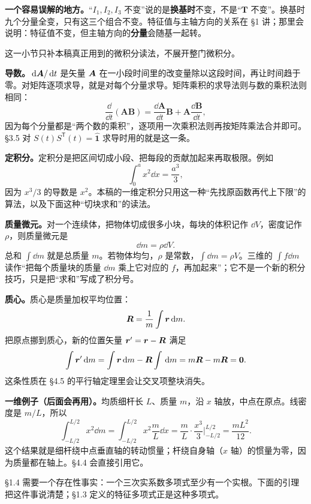 \documentclass[11pt]{ctexart}
\newcommand{\ten}[1]{\mathbf{#1}}
\newcommand{\unitd}{\hat{\ten{1}}}
\let\origsubhdr\subhdr
\renewcommand{\subhdr}[1]{\par\needspace{3\baselineskip}\origsubhdr{#1}}
\begin{document}
\textbf{一个容易误解的地方。}“$I_1,I_2,I_3$ 不变”说的是\textbf{换基时}不变，不是“$\ten T$ 不变”。换基时九个分量全变，只有这三个组合不变。特征值与主轴方向的关系在 \S1 讲；那里会说明：特征值不变，但主轴方向的\textbf{分量}会随基一起转。

\label{subsec:calculus}

这一小节只补本稿真正用到的微积分读法，不展开整门微积分。

\textbf{导数。}$\,\mathrm{d}\boldsymbol{A}/\,\mathrm{d} t$ 是矢量 $\boldsymbol{A}$ 在一小段时间里的改变量除以这段时间，再让时间趋于零。对矩阵逐项求导，就是对每个分量求导。矩阵乘积的求导法则与数的乘积法则相同：
\[
\frac{\dd}{\dd t}(\ten A\ten B)=\frac{\dd\ten A}{\dd t}\ten B+\ten A\frac{\dd\ten B}{\dd t},
\]
因为每个分量都是“两个数的乘积”，逐项用一次乘积法则再按矩阵乘法合并即可。\S3.5 对 $S(t)S^{\mathsf T}(t)=\unitd$ 求导时用的就是这一条。

\textbf{定积分。}定积分是把区间切成小段、把每段的贡献加起来再取极限。例如
\[
\int_0^a x^2\dd x=\frac{a^3}{3},
\]
因为 $x^3/3$ 的导数是 $x^2$。本稿的一维定积分只用这一种“先找原函数再代上下限”的算法，以及下面这种“切块求和”的读法。

\textbf{质量微元。}对一个连续体，把物体切成很多小块，每块的体积记作 $\dd V$，密度记作 $\rho$，则质量微元是
\[
\dd m=\rho\dd V .
\]
总和 $\int\dd m$ 就是总质量 $m$。若物体均匀，$\rho$ 是常数，$\int\dd m=\rho V$。三维的 $\int f\dd m$ 读作“把每个质量块的质量 $\dd m$ 乘上它对应的 $f$，再加起来”；它不是一个新的积分技巧，只是把“求和”写成了积分号。

\textbf{质心。}质心是质量加权平均位置：
\[
\boldsymbol{R}=\frac{1}{m}\int\boldsymbol{r}\,\mathrm{d} m .
\]
把原点挪到质心，新的位置矢量 $\boldsymbol{r}'=\boldsymbol{r}-\boldsymbol{R}$ 满足
\[
\int\boldsymbol{r}'\,\mathrm{d} m=\int\boldsymbol{r}\,\mathrm{d} m-\boldsymbol{R}\int\,\mathrm{d} m=m\boldsymbol{R}-m\boldsymbol{R}=\boldsymbol{0} .
\]
这条性质在 \S4.5 的平行轴定理里会让交叉项整块消失。

\textbf{一维例子（后面会再用）。}均质细杆长 $L$、质量 $m$，沿 $x$ 轴放，中点在原点。线密度是 $m/L$，所以
\[
\int_{-L/2}^{L/2}x^2\dd m
=\int_{-L/2}^{L/2}x^2\frac{m}{L}\dd x
=\frac{m}{L}\cdot\frac{x^3}{3}\Big|_{-L/2}^{L/2}
=\frac{mL^2}{12}.
\]
这个结果就是细杆绕中点垂直轴的转动惯量；杆绕自身轴（$x$ 轴）的惯量为零，因为质量都在轴上。\S4.4 会直接引用它。

\label{subsec:realroot}

\S1.4 需要一个存在性事实：一个三次实系数多项式至少有一个实根。下面的引理把这件事说清楚；\S1.3 定义的特征多项式正是这种多项式。

\begin{center}
\end{center}
\end{document}
